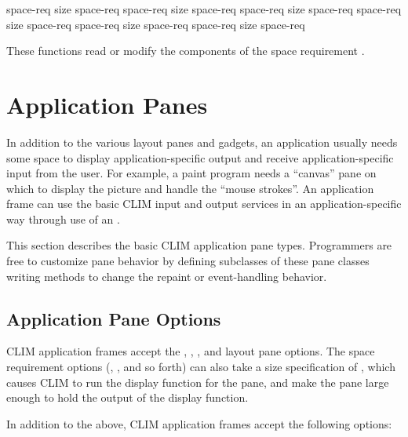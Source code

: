              {space-req}
      {size space-req}
         {space-req}
  {size space-req}
         {space-req}
  {size space-req}
            {space-req}
     {size space-req}
        {space-req}
 {size space-req}
        {space-req}
 {size space-req}

These functions read or modify the components of the space requirement
.


\section {Application Panes\label{clim-panes}}

In addition to the various layout panes and gadgets, an application usually
needs some space to display application-specific output and receive
application-specific input from the user.  For example, a paint program needs a
``canvas'' pane on which to display the picture and handle the ``mouse
strokes''.  An application frame can use the basic CLIM input and output
services in an application-specific way through use of an .

This section describes the basic CLIM application pane types.  Programmers are
free to customize pane behavior by defining subclasses of these pane classes
writing methods to change the repaint or event-handling behavior.


\subsection {Application Pane Options}

CLIM application frames accept the , ,
, and layout pane options.  The space requirement options
(, , and so forth) can also take a size specification of
, which causes CLIM to run the display function for the pane, and
make the pane large enough to hold the output of the display function.

In addition to the above, CLIM application frames accept the following options:

